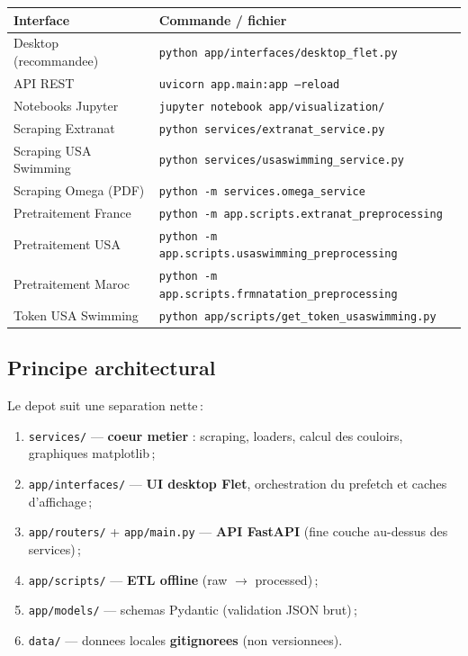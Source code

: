 \documentclass[11pt,a4paper]{article}
\begin{document}
\begin{longtable}{@{}p{}p{}@{}}
\toprule
\textbf{Interface} & \textbf{Commande / fichier} \\
\midrule
\endhead
Desktop (recommandee) & \texttt{python app/interfaces/desktop\_flet.py} \\
API REST & \texttt{uvicorn app.main:app --reload} \\
Notebooks Jupyter & \texttt{jupyter notebook app/visualization/} \\
Scraping Extranat & \texttt{python services/extranat\_service.py} \\
Scraping USA Swimming & \texttt{python services/usaswimming\_service.py} \\
Scraping Omega (PDF) & \texttt{python -m services.omega\_service} \\
Pretraitement France & \texttt{python -m app.scripts.extranat\_preprocessing} \\
Pretraitement USA & \texttt{python -m app.scripts.usaswimming\_preprocessing} \\
Pretraitement Maroc & \texttt{python -m app.scripts.frmnatation\_preprocessing} \\
Token USA Swimming & \texttt{python app/scripts/get\_token\_usaswimming.py} \\
\bottomrule
\end{longtable}

\subsection{Principe architectural}

Le depot suit une separation nette\,:

\begin{enumerate}
  \item \texttt{services/} --- \textbf{coeur metier} : scraping, loaders, calcul des couloirs, graphiques matplotlib\,;
  \item \texttt{app/interfaces/} --- \textbf{UI desktop Flet}, orchestration du prefetch et caches d'affichage\,;
  \item \texttt{app/routers/} + \texttt{app/main.py} --- \textbf{API FastAPI} (fine couche au-dessus des services)\,;
  \item \texttt{app/scripts/} --- \textbf{ETL offline} (raw $\rightarrow$ processed)\,;
  \item \texttt{app/models/} --- schemas Pydantic (validation JSON brut)\,;
  \item \texttt{data/} --- donnees locales \textbf{gitignorees} (non versionnees).
\end{enumerate}
\end{document}
